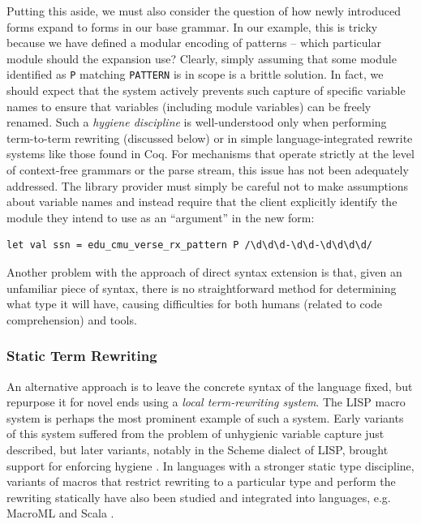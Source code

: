 Putting this aside, we must also consider the question of how newly introduced forms expand to forms in our base grammar. In our example, this is tricky because we have defined a modular encoding of patterns -- which particular module should the expansion use? Clearly, simply assuming that some module identified as \lstinline{P} matching \lstinline{PATTERN} is in scope is a brittle solution. In fact, we should expect that the system actively prevents such capture of specific variable names to ensure that variables (including module variables) can be freely renamed. Such a \emph{hygiene discipline} is well-understood only when performing term-to-term rewriting (discussed below) or in simple language-integrated rewrite systems like those found in Coq. For mechanisms that operate strictly at the level of context-free grammars or the parse stream, this issue has not been adequately addressed. The library provider must simply be careful not to make assumptions about variable names and instead require that the client explicitly identify the module they intend to use as an ``argument'' in the new form:
\begin{lstlisting}[numbers=none]
let val ssn = edu_cmu_verse_rx_pattern P /\d\d\d-\d\d-\d\d\d\d/
\end{lstlisting}

Another problem with the approach of direct syntax extension is that, given an unfamiliar piece of syntax, there is no straightforward method for determining what type it will have, causing difficulties for both humans (related to code comprehension) and tools. 

\subsubsection{Static Term Rewriting}\label{sec:term-rewriting}
An alternative approach is to leave the concrete syntax of the language fixed, but repurpose it for novel ends using a \emph{local term-rewriting system}. The LISP macro system \cite{Hart63a} is perhaps the most prominent example of such a system. Early variants of this system suffered from the problem of unhygienic variable capture just described, but  later variants, notably in the Scheme dialect of LISP, brought support for enforcing hygiene \cite{Kohlbecker86a}. In languages with a stronger static type discipline, variants of macros that restrict rewriting to a particular type and perform the rewriting statically have also been studied \cite{Herman10:Theory,ganz2001macros} and integrated into languages, e.g. MacroML \cite{ganz2001macros} and Scala \cite{ScalaMacros2013}. 

